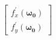 \documentclass[preview]{standalone}
\begin{document}
\begin{align*}
\begin{bmatrix} f_x^{\prime}(\mathbf{\omega_0}) \\ f_y^{\prime}(\mathbf{\omega_0}) \end{bmatrix}
\end{align*}
\end{document}
